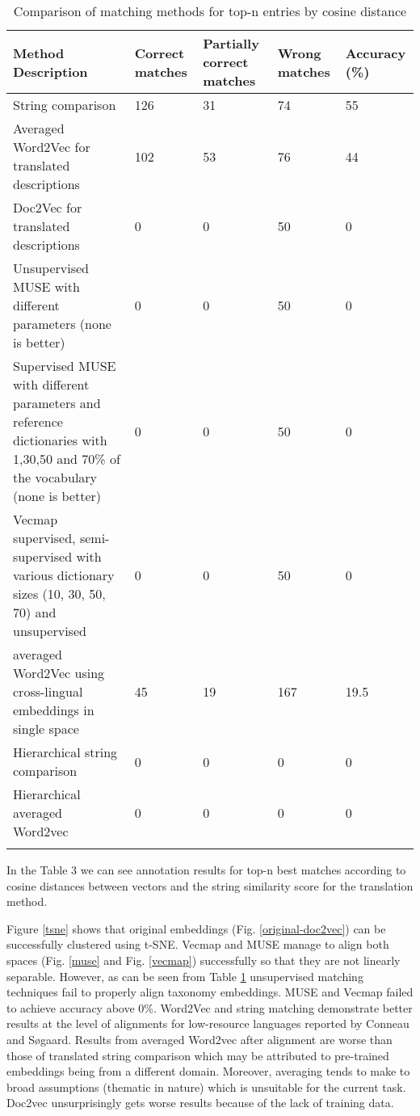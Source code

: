 \documentclass[conference]{IEEEtran}
\begin{document}
\begin{center}
\begin{table}[!htbp]
\caption{Comparison of matching methods for top-n entries by cosine distance}
\begin{tabular}{p{3.3cm}|p{0.8cm}|p{0.9cm}|p{0.8cm}|p{0.8cm}}
  Method \newline Description & Correct matches & Partially correct matches & Wrong matches &
  Accuracy \newline (\%)\\
  \hline
  \hline
  String comparison & 126 & 31 & 74 & 55\\
  \hline
  Averaged Word2Vec for translated descriptions & 102 & 53 & 76 & 44\\
  \hline
  Doc2Vec for translated descriptions & 0 & 0 & 50 & 0\\
  \hline
  Unsupervised MUSE with different parameters (none is better) & 0 & 0 & 50 & 0\\
  \hline
  Supervised MUSE with different parameters and reference dictionaries with 1,30,50 and 70\% of the vocabulary (none is better) & 0 & 0 & 50 & 0\\
  \hline
  Vecmap supervised, semi-supervised with various dictionary sizes (10, 30, 50, 70) and unsupervised  & 0 & 0 & 50 & 0\\
    \hline
  averaged Word2Vec using cross-lingual embeddings in single space  & 45 & 19 & 167 & 19.5\\
    \hline
    Hierarchical string comparison & 0 & 0 & 0 & 0\\
    \hline
    Hierarchical averaged Word2vec & 0 & 0 & 0 & 0\\
\label{table-accuracies}
\end{tabular}
\end{table}
\end{center}

In the Table 3 we can see annotation results for top-n best matches according to cosine distances between vectors and the string similarity score for the translation method.

Figure \ref{tsne} shows that original embeddings (Fig. \ref{original-doc2vec}) can be successfully clustered using t-SNE. Vecmap and MUSE manage to align both spaces (Fig. \ref{muse} and Fig. \ref{vecmap}) successfully so that they are not linearly separable. However, as can be seen from Table \ref{table-accuracies} unsupervised matching techniques fail to properly align taxonomy embeddings. MUSE and Vecmap failed to achieve accuracy above 0\%. Word2Vec and string matching demonstrate better results at the level of alignments for low-resource languages reported by Conneau and Søgaard. Results from averaged Word2vec after alignment are worse than those of translated string comparison which may be attributed to pre-trained embeddings being from a different domain. Moreover, averaging tends to make to broad assumptions (thematic in nature) which is unsuitable for the current task. Doc2vec unsurprisingly gets worse results because of the lack of training data.
\end{document}
